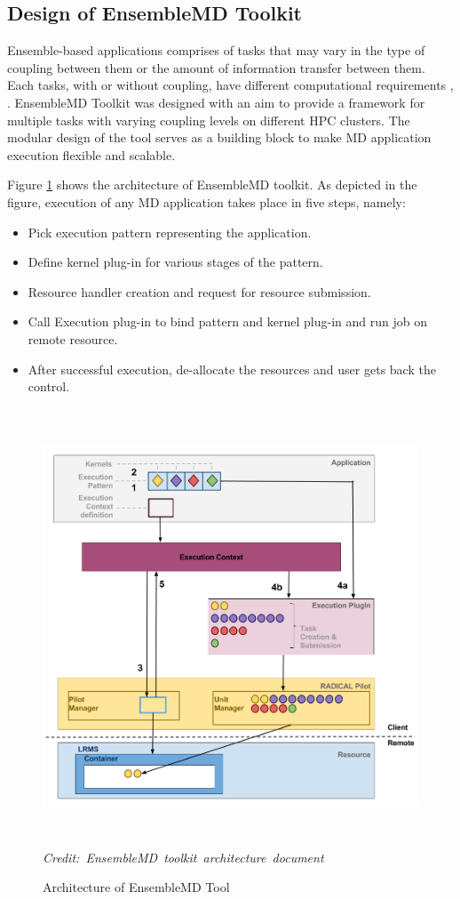 \documentclass[10pt]{ruthesis}
\begin{document}
\subsection{Design of EnsembleMD Toolkit}
Ensemble-based applications comprises of tasks that may vary in the type of coupling between them or the amount of information transfer between them. Each tasks, with or without coupling, have different computational requirements \cite{ref2}, \cite{ref3}. EnsembleMD Toolkit was designed with an aim to provide a framework for multiple tasks with varying coupling levels on different HPC clusters. The modular design of the tool serves as a building block to make MD application execution flexible and scalable.

Figure \ref{fig:enmd_arch} \cite{site1} shows the architecture of EnsembleMD toolkit. As depicted in the figure, execution of any MD application takes place in five steps, namely:

\begin{itemize}
	\item Pick execution pattern representing the application.
	\item Define kernel plug-in for various stages of the pattern.
	\item Resource handler creation and request for resource submission.
	\item Call Execution plug-in to bind pattern and kernel plug-in and run job on remote resource.
	\item After successful execution, de-allocate the resources and user gets back the control.
\end{itemize}

\begin{figure}
  \centering
  \includegraphics[width=13cm,height=13cm]{enmdtk_arch.png}
  \hbox{\small\itshape Credit: EnsembleMD toolkit architecture document} \cite{site1}
  \caption{Architecture of EnsembleMD Tool}
  \label{fig:enmd_arch}
\end{figure}
\end{document}
